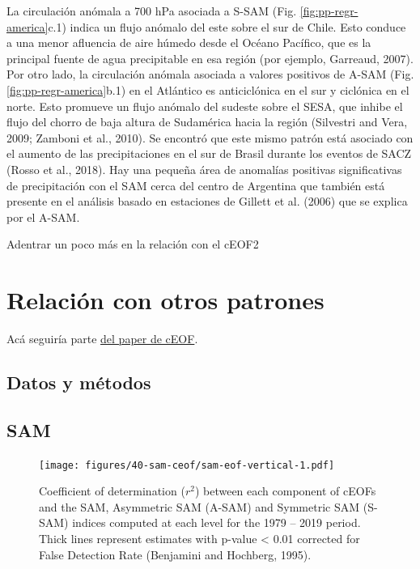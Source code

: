 \documentclass[12pt,oneside]{reedthesis}
\begin{document}
La circulación anómala a 700 hPa asociada a S-SAM (Fig. \ref{fig:pp-regr-america}c.1) indica un flujo anómalo del este sobre el sur de Chile. Esto conduce a una menor afluencia de aire húmedo desde el Océano Pacífico, que es la principal fuente de agua precipitable en esa región (por ejemplo, Garreaud, 2007). Por otro lado, la circulación anómala asociada a valores positivos de A-SAM (Fig. \ref{fig:pp-regr-america}b.1) en el Atlántico es anticiclónica en el sur y ciclónica en el norte. Esto promueve un flujo anómalo del sudeste sobre el SESA, que inhibe el flujo del chorro de baja altura de Sudamérica hacia la región (Silvestri and Vera, 2009; Zamboni et al., 2010). Se encontró que este mismo patrón está asociado con el aumento de las precipitaciones en el sur de Brasil durante los eventos de SACZ (Rosso et al., 2018).
Hay una pequeña área de anomalías positivas significativas de precipitación con el SAM cerca del centro de Argentina que también está presente en el análisis basado en estaciones de Gillett et al. (2006) que se explica por el A-SAM.

Adentrar un poco más en la relación con el cEOF2

\hypertarget{relaciuxf3n-con-otros-patrones}{%
\section{Relación con otros patrones}\label{relaciuxf3n-con-otros-patrones}}

Acá seguiría parte \href{https://github.com/eliocamp/shceof}{del paper de cEOF}.

\hypertarget{datos-y-muxe9todos-2}{%
\subsection{Datos y métodos}\label{datos-y-muxe9todos-2}}

\hypertarget{sam}{%
\subsection{SAM}\label{sam}}



\begin{figure}
\centering
\texttt{[image: figures/40-sam-ceof/sam-eof-vertical-1.pdf]}
\caption{\label{fig:sam-eof-vertical}Coefficient of determination (\(r^2\)) between each component of cEOFs and the SAM, Asymmetric SAM (A-SAM) and Symmetric SAM (S-SAM) indices computed at each level for the 1979 -- 2019 period. Thick lines represent estimates with p-value \textless{} 0.01 corrected for False Detection Rate (Benjamini and Hochberg, 1995).}
\end{figure}
\end{document}
